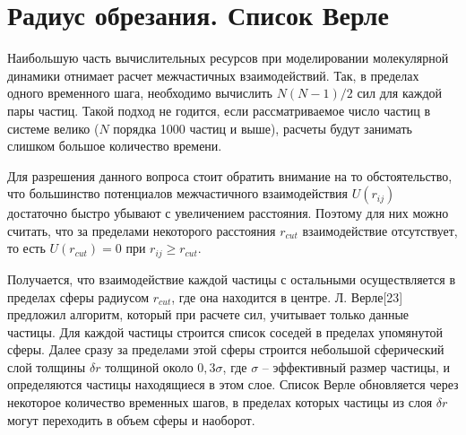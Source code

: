 \section{Радиус обрезания. Список Верле}
Наибольшую часть вычислительных ресурсов при моделировании молекулярной динамики отнимает расчет межчастичных взаимодействий. Так, в пределах одного временного шага, необходимо вычислить $N(N-1)/2$ сил для каждой пары частиц. Такой подход не годится, если рассматриваемое число частиц в системе велико ($N$ порядка 1000 частиц и выше), расчеты будут занимать слишком большое количество времени.
\par Для разрешения данного вопроса стоит обратить внимание на то обстоятельство, что большинство потенциалов межчастичного взаимодействия $U(r_{ij})$ достаточно быстро убывают с увеличением расстояния. Поэтому для них можно считать, что за пределами некоторого расстояния $r_{cut}$ взаимодействие отсутствует, то есть $U(r_{cut}) = 0$ при $r_{ij}\geq r_{cut}$.
\par Получается, что взаимодействие каждой частицы с остальными осуществляется в пределах сферы радиусом $r_{cut}$, где она находится в центре. Л. Верле[23] предложил алгоритм, который при расчете сил, учитывает только данные частицы. Для каждой частицы строится список соседей в пределах упомянутой сферы. Далее сразу за пределами этой сферы строится небольшой сферический слой толщины $\delta r$ толщиной около $0,3\sigma$, где $\sigma$ -- эффективный размер частицы, и определяются частицы находящиеся в этом слое. Список Верле обновляется через некоторое количество временных шагов, в пределах которых частицы из слоя $\delta r$ могут переходить в объем сферы и наоборот.

